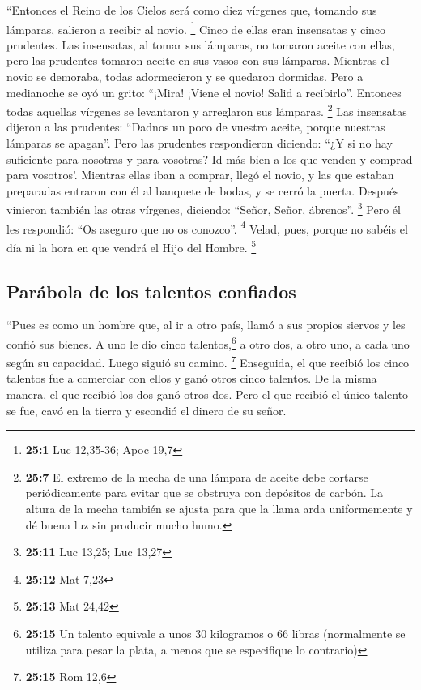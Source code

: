 \begin{paracol}{2}
 ``Entonces el Reino de los Cielos será como diez vírgenes
que, tomando sus lámparas, salieron a recibir al novio. \footnote{\textbf{25:1}
  Luc 12,35-36; Apoc 19,7}  Cinco de ellas eran insensatas
y cinco prudentes.  Las insensatas, al tomar sus lámparas,
no tomaron aceite con ellas,  pero las prudentes tomaron
aceite en sus vasos con sus lámparas.  Mientras el novio
se demoraba, todas adormecieron y se quedaron dormidas. 
Pero a medianoche se oyó un grito: ``¡Mira! ¡Viene el novio! Salid a
recibirlo''.  Entonces todas aquellas vírgenes se
levantaron y arreglaron sus lámparas. \footnote{\textbf{25:7} El extremo
  de la mecha de una lámpara de aceite debe cortarse periódicamente para
  evitar que se obstruya con depósitos de carbón. La altura de la mecha
  también se ajusta para que la llama arda uniformemente y dé buena luz
  sin producir mucho humo.}  Las insensatas dijeron a las
prudentes: ``Dadnos un poco de vuestro aceite, porque nuestras lámparas
se apagan''.  Pero las prudentes respondieron diciendo:
``¿Y si no hay suficiente para nosotras y para vosotras? Id más bien a
los que venden y comprad para vosotros'.  Mientras ellas
iban a comprar, llegó el novio, y las que estaban preparadas entraron
con él al banquete de bodas, y se cerró la puerta. 
Después vinieron también las otras vírgenes, diciendo: ``Señor, Señor,
ábrenos''. \footnote{\textbf{25:11} Luc 13,25; Luc 13,27}
 Pero él les respondió: ``Os aseguro que no os conozco''.
\footnote{\textbf{25:12} Mat 7,23}  Velad, pues, porque
no sabéis el día ni la hora en que vendrá el Hijo del Hombre.
\footnote{\textbf{25:13} Mat 24,42}

\hypertarget{paruxe1bola-de-los-talentos-confiados}{%
\subsection{Parábola de los talentos
confiados}\label{paruxe1bola-de-los-talentos-confiados}}

 ``Pues es como un hombre que, al ir a otro país, llamó a
sus propios siervos y les confió sus bienes.  A uno le
dio cinco talentos,\footnote{\textbf{25:15} Un talento equivale a unos
  30 kilogramos o 66 libras (normalmente se utiliza para pesar la plata,
  a menos que se especifique lo contrario)} a otro dos, a otro uno, a
cada uno según su capacidad. Luego siguió su camino. \footnote{\textbf{25:15}
  Rom 12,6}  Enseguida, el que recibió los cinco talentos
fue a comerciar con ellos y ganó otros cinco talentos. 
De la misma manera, el que recibió los dos ganó otros dos.
 Pero el que recibió el único talento se fue, cavó en la
tierra y escondió el dinero de su señor.


\end{paracol}
